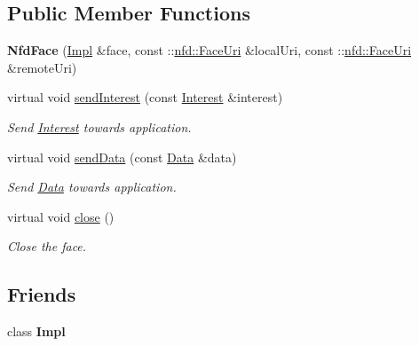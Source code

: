 \subsection*{Public Member Functions}
\begin{DoxyCompactItemize}
\item 
{\bfseries Nfd\+Face} (\hyperlink{classndn_1_1Face_1_1Impl}{Impl} \&face, const \+::\hyperlink{classndn_1_1util_1_1FaceUri}{nfd\+::\+Face\+Uri} \&local\+Uri, const \+::\hyperlink{classndn_1_1util_1_1FaceUri}{nfd\+::\+Face\+Uri} \&remote\+Uri)\hypertarget{classndn_1_1Face_1_1Impl_1_1NfdFace_a0b05f382b9b433ab1a074264623cd6c1}{}\label{classndn_1_1Face_1_1Impl_1_1NfdFace_a0b05f382b9b433ab1a074264623cd6c1}

\item 
virtual void \hyperlink{classndn_1_1Face_1_1Impl_1_1NfdFace_a3c93300a94f1b9b03834d89ed21a3e54}{send\+Interest} (const \hyperlink{classndn_1_1Interest}{Interest} \&interest)\hypertarget{classndn_1_1Face_1_1Impl_1_1NfdFace_a3c93300a94f1b9b03834d89ed21a3e54}{}\label{classndn_1_1Face_1_1Impl_1_1NfdFace_a3c93300a94f1b9b03834d89ed21a3e54}

\begin{DoxyCompactList}\small\item\em Send \hyperlink{classndn_1_1Interest}{Interest} towards application. \end{DoxyCompactList}\item 
virtual void \hyperlink{classndn_1_1Face_1_1Impl_1_1NfdFace_ade6499357e646ae0eb9b5bf773a16f64}{send\+Data} (const \hyperlink{classndn_1_1Data}{Data} \&data)\hypertarget{classndn_1_1Face_1_1Impl_1_1NfdFace_ade6499357e646ae0eb9b5bf773a16f64}{}\label{classndn_1_1Face_1_1Impl_1_1NfdFace_ade6499357e646ae0eb9b5bf773a16f64}

\begin{DoxyCompactList}\small\item\em Send \hyperlink{classndn_1_1Data}{Data} towards application. \end{DoxyCompactList}\item 
virtual void \hyperlink{classndn_1_1Face_1_1Impl_1_1NfdFace_a96acc02cef44e8d79e1e0d661b948675}{close} ()
\begin{DoxyCompactList}\small\item\em Close the face. \end{DoxyCompactList}\end{DoxyCompactItemize}
\subsection*{Friends}
\begin{DoxyCompactItemize}
\item 
class {\bfseries Impl}\hypertarget{classndn_1_1Face_1_1Impl_1_1NfdFace_ae708b2c3f144ba0c31bb444c4efe8ccf}{}\label{classndn_1_1Face_1_1Impl_1_1NfdFace_ae708b2c3f144ba0c31bb444c4efe8ccf}

\end{DoxyCompactItemize}
